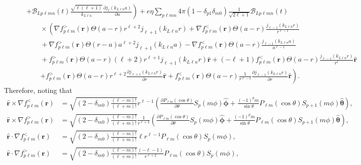 \documentclass{article}
\begin{document}
\begin{equation}
\begin{split}
&\qquad\left. + \mathcal{B}_{Lp\ell mn}(t)\frac{\sqrt{\ell(\ell + 1)}}{k_{L\ell n}}\frac{\partial j_{\ell}(k_{L\ell n}a)}{\partial a}\right)+ e\eta\sum_{p\ell mn}4\pi(1 - \delta_{p1}\delta_{m0})\frac{1}{\sqrt{2\ell + 1}}\mathcal{B}_{Lp\ell mn}(t)\\
&\qquad\qquad\times\left(\nabla f_{p\ell m}^>(\mathbf{r})\Theta(a - r)r^{\ell + 2}j_{\ell + 1}(k_{L\ell n}r) + \nabla f_{p\ell m}^<(\mathbf{r})\Theta(a - r)\frac{j_{\ell - 1}(k_{L\ell n}r)}{r^{\ell - 1}}\right.\\
&\qquad\qquad + \nabla f_{p\ell m}^>(\mathbf{r})\Theta(r - a)a^{\ell + 2}j_{\ell + 1}(k_{L\ell n}a) - \nabla f_{p\ell m}^<(\mathbf{r})\Theta(a - r)\frac{j_{\ell - 1}(k_{L\ell n}a)}{a^{\ell - 1}}\\
&\qquad\qquad + f_{p\ell m}^>(\mathbf{r})\Theta(a - r)(\ell + 2)r^{\ell + 1}j_{\ell + 1}(k_{L\ell n}r)\hat{\mathbf{r}} + (-\ell + 1)f_{p\ell m}^<(\mathbf{r})\Theta(a - r)\frac{j_{\ell - 1}(k_{L\ell n}r)}{r^\ell}\hat{\mathbf{r}}\\
&\qquad\qquad\left. + f_{p\ell m}^>(\mathbf{r})\Theta(a - r)r^{\ell + 2}\frac{\partial j_{\ell + 1}(k_{L\ell n}r)}{\partial r}\hat{\mathbf{r}} + f_{p\ell m}^<(\mathbf{r})\Theta(a - r)\frac{1}{r^{\ell - 1}}\frac{\partial j_{\ell - 1}(k_{L\ell n}r)}{\partial r}\hat{\mathbf{r}}\right).
\end{split}
\end{equation}
Therefore, noting that
\begin{equation}
\begin{split}
\hat{\mathbf{r}}\times\nabla f_{p\ell m}^<(\mathbf{r}) &= \sqrt{(2 - \delta_{m0})\frac{(\ell - m)!}{(\ell + m)!}}r^{\ell - 1}\left(\frac{\partial P_{\ell m}(\cos\theta)}{\partial \theta}S_p(m\phi)\hat{\bm{\phi}} + \frac{(-1)^pm}{\sin\theta}P_{\ell m}(\cos\theta)S_{p+1}(m\phi)\hat{\bm{\theta}}\right),\\
\hat{\mathbf{r}}\times\nabla f_{p\ell m}^>(\mathbf{r}) &= \sqrt{(2 - \delta_{m0})\frac{(\ell - m)!}{(\ell + m)!}}\frac{1}{r^{\ell + 2}}\left(\frac{\partial P_{\ell m}(\cos\theta)}{\partial \theta}S_p(m\phi)\hat{\bm{\phi}} + \frac{(-1)^pm}{\sin\theta}P_{\ell m}(\cos\theta)S_{p+1}(m\phi)\hat{\bm{\theta}}\right),\\
\hat{\mathbf{r}}\cdot\nabla f_{p\ell m}^<(\mathbf{r}) &= \sqrt{(2 - \delta_{m0})\frac{(\ell - m)!}{(\ell + m)!}}\ell r^{\ell - 1}P_{\ell m}(\cos\theta)S_p(m\phi),\\
\hat{\mathbf{r}}\cdot\nabla f_{p\ell m}^>(\mathbf{r}) &= \sqrt{(2 - \delta_{m0})\frac{(\ell - m)!}{(\ell + m)!}}\frac{(-\ell - 1)}{r^{\ell + 2}}P_{\ell m}(\cos\theta)S_p(m\phi),
\end{split}
\end{equation}
\end{document}
